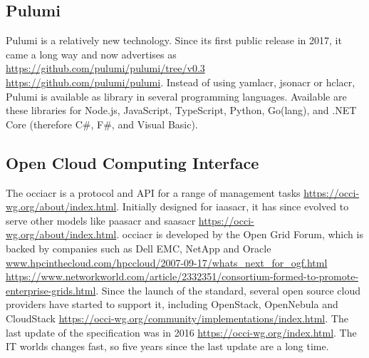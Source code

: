 \subsection{Pulumi}
Pulumi is a relatively new technology. Since its first public release in 2017, it came a long way and now advertises as  \url{https://github.com/pulumi/pulumi/tree/v0.3} \url{https://github.com/pulumi/pulumi}. Instead of using \gls{yamlacr}, \gls{jsonacr} or \gls{hclacr}, Pulumi is available as library in several programming languages. Available are these libraries for Node.js, JavaScript, TypeScript, Python, Go(lang), and .NET Core (therefore C\#, F\#, and Visual Basic).

\subsection{Open Cloud Computing Interface} %
The \gls{occiacr} is a protocol and API for a range of management tasks \url{https://occi-wg.org/about/index.html}. Initially designed for \gls{iaasacr}, it has since evolved to serve other models like \gls{paasacr} and \gls{saasacr} \url{https://occi-wg.org/about/index.html}. \Gls{occiacr} is developed by the Open Grid Forum, which is backed by companies such as Dell EMC, NetApp and Oracle \url{www.hpcinthecloud.com/hpccloud/2007-09-17/whats_next_for_ogf.html} \url{https://www.networkworld.com/article/2332351/consortium-formed-to-promote-enterprise-grids.html}. Since the launch of the standard, several open source cloud providers have started to support it, including OpenStack, OpenNebula and CloudStack \url{https://occi-wg.org/community/implementations/index.html}. The last update of the specification was in 2016 \url{https://occi-wg.org/index.html}. The IT worlds changes fast, so five years since the last update are a long time.

